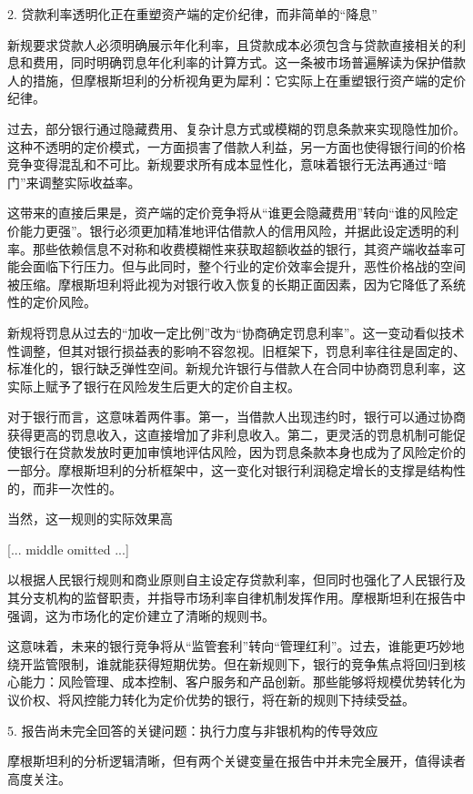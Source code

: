 \documentclass[11pt]{ctexart}
\begin{document}
2. 贷款利率透明化正在重塑资产端的定价纪律，而非简单的“降息”

新规要求贷款人必须明确展示年化利率，且贷款成本必须包含与贷款直接相关的利息和费用，同时明确罚息年化利率的计算方式。这一条被市场普遍解读为保护借款人的措施，但摩根斯坦利的分析视角更为犀利：它实际上在重塑银行资产端的定价纪律。

过去，部分银行通过隐藏费用、复杂计息方式或模糊的罚息条款来实现隐性加价。这种不透明的定价模式，一方面损害了借款人利益，另一方面也使得银行间的价格竞争变得混乱和不可比。新规要求所有成本显性化，意味着银行无法再通过“暗门”来调整实际收益率。

这带来的直接后果是，资产端的定价竞争将从“谁更会隐藏费用”转向“谁的风险定价能力更强”。银行必须更加精准地评估借款人的信用风险，并据此设定透明的利率。那些依赖信息不对称和收费模糊性来获取超额收益的银行，其资产端收益率可能会面临下行压力。但与此同时，整个行业的定价效率会提升，恶性价格战的空间被压缩。摩根斯坦利将此视为对银行收入恢复的长期正面因素，因为它降低了系统性的定价风险。

新规将罚息从过去的“加收一定比例”改为“协商确定罚息利率”。这一变动看似技术性调整，但其对银行损益表的影响不容忽视。旧框架下，罚息利率往往是固定的、标准化的，银行缺乏弹性空间。新规允许银行与借款人在合同中协商罚息利率，这实际上赋予了银行在风险发生后更大的定价自主权。

对于银行而言，这意味着两件事。第一，当借款人出现违约时，银行可以通过协商获得更高的罚息收入，这直接增加了非利息收入。第二，更灵活的罚息机制可能促使银行在贷款发放时更加审慎地评估风险，因为罚息条款本身也成为了风险定价的一部分。摩根斯坦利的分析框架中，这一变化对银行利润稳定增长的支撑是结构性的，而非一次性的。

当然，这一规则的实际效果高

[... middle omitted ...]

以根据人民银行规则和商业原则自主设定存贷款利率，但同时也强化了人民银行及其分支机构的监督职责，并指导市场利率自律机制发挥作用。摩根斯坦利在报告中强调，这为市场化的定价建立了清晰的规则书。

这意味着，未来的银行竞争将从“监管套利”转向“管理红利”。过去，谁能更巧妙地绕开监管限制，谁就能获得短期优势。但在新规则下，银行的竞争焦点将回归到核心能力：风险管理、成本控制、客户服务和产品创新。那些能够将规模优势转化为议价权、将风控能力转化为定价优势的银行，将在新的规则下持续受益。

5. 报告尚未完全回答的关键问题：执行力度与非银机构的传导效应

摩根斯坦利的分析逻辑清晰，但有两个关键变量在报告中并未完全展开，值得读者高度关注。
\end{document}
